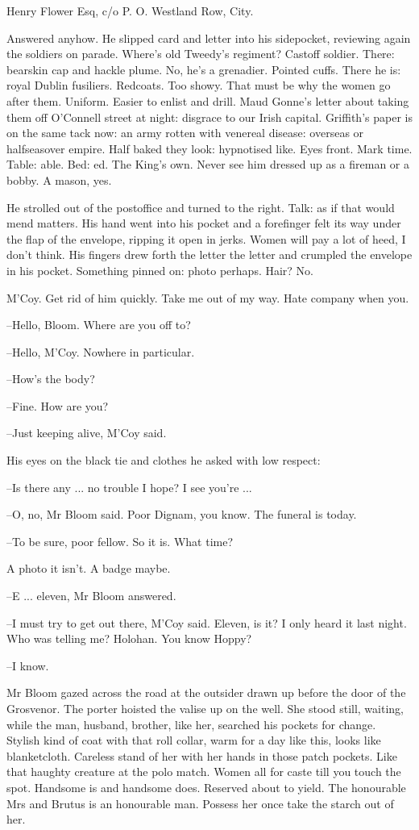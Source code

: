 Henry Flower Esq,
c/o P. O. Westland Row,
City.


Answered anyhow. He slipped card and letter into his sidepocket,
reviewing again the soldiers on parade. Where's old Tweedy's regiment?
Castoff soldier. There: bearskin cap and hackle plume. No, he's a
grenadier. Pointed cuffs. There he is: royal Dublin fusiliers. Redcoats.
Too showy. That must be why the women go after them. Uniform. Easier to
enlist and drill. Maud Gonne's letter about taking them off O'Connell
street at night: disgrace to our Irish capital. Griffith's paper is on
the same tack now: an army rotten with venereal disease: overseas or
halfseasover empire. Half baked they look: hypnotised like. Eyes front.
Mark time. Table: able. Bed: ed. The King's own. Never see him dressed up
as a fireman or a bobby. A mason, yes.

He strolled out of the postoffice and turned to the right. Talk: as if
that would mend matters. His hand went into his pocket and a forefinger
felt its way under the flap of the envelope, ripping it open in jerks.
Women will pay a lot of heed, I don't think. His fingers drew forth the
letter the letter and crumpled the envelope in his pocket. Something
pinned on: photo perhaps. Hair? No.

M'Coy. Get rid of him quickly. Take me out of my way. Hate company when
you.

--Hello, Bloom. Where are you off to?

--Hello, M'Coy. Nowhere in particular.

--How's the body?

--Fine. How are you?

--Just keeping alive, M'Coy said.

His eyes on the black tie and clothes he asked with low respect:

--Is there any ... no trouble I hope? I see you're ...

--O, no, Mr Bloom said. Poor Dignam, you know. The funeral is today.

--To be sure, poor fellow. So it is. What time?

A photo it isn't. A badge maybe.

--E ... eleven, Mr Bloom answered.

--I must try to get out there, M'Coy said. Eleven, is it? I only heard it
last night. Who was telling me? Holohan. You know Hoppy?

--I know.

Mr Bloom gazed across the road at the outsider drawn up before the door
of the Grosvenor. The porter hoisted the valise up on the well. She stood
still, waiting, while the man, husband, brother, like her, searched his
pockets for change. Stylish kind of coat with that roll collar, warm for
a day like this, looks like blanketcloth. Careless stand of her with her
hands in those patch pockets. Like that haughty creature at the polo
match. Women all for caste till you touch the spot. Handsome is and
handsome does. Reserved about to yield. The honourable Mrs and Brutus is
an honourable man. Possess her once take the starch out of her.

